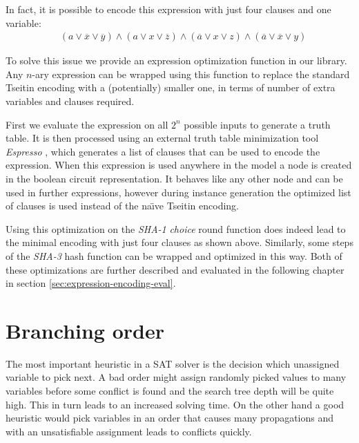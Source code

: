 In fact, it is possible to encode this expression with just four clauses and one variable:
\begin{align*}
&(a \lor \overline{x} \lor \overline{y}) \land (a \lor x \lor \overline{z}) \land (\overline{a} \lor x \lor z) \land (\overline{a} \lor \overline{x} \lor y)
\end{align*}


To solve this issue we provide an expression optimization function in our library.
Any $n$-ary expression can be wrapped using this function to replace the standard Tseitin encoding with a (potentially) smaller one, in terms of number of extra variables and clauses required.

First we evaluate the expression on all $2^n$ possible inputs to generate a truth table.
It is then processed using an external truth table minimization tool \emph{Espresso} \cite{rudell1986multiple}, which generates a list of clauses that can be used to encode the expression.
When this expression is used anywhere in the model a node is created in the boolean circuit representation.
It behaves like any other node and can be used in further expressions, however during instance generation the optimized list of clauses is used instead of the na\"{\i}ve Tseitin encoding.

Using this optimization on the \emph{SHA-1} \emph{choice} round function does indeed lead to the minimal encoding with just four clauses as shown above.
Similarly, some steps of the \emph{SHA-3} hash function can be wrapped and optimized in this way.
Both of these optimizations are further described and evaluated in the following chapter in section \ref{sec:expression-encoding-eval}.

\section{Branching order}
\label{sec:branching-order}

The most important heuristic in a SAT solver is the decision which unassigned variable to pick next.
A bad order might assign randomly picked values to many variables before some conflict is found and the search tree depth will be quite high.
This in turn leads to an increased solving time.
On the other hand a good heuristic would pick variables in an order that causes many propagations and with an unsatisfiable assignment leads to conflicts quickly.

